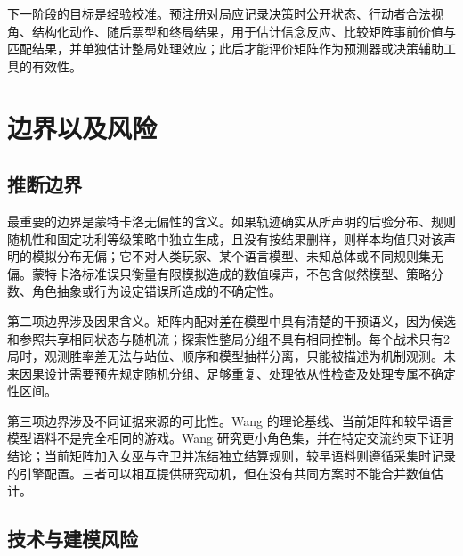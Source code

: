\documentclass[UTF8,11pt,a4paper,fontset=windows]{ctexart}
\begin{document}
下一阶段的目标是经验校准。预注册对局应记录决策时公开状态、行动者合法视角、结构化动作、随后票型和终局结果，用于估计信念反应、比较矩阵事前价值与匹配结果，并单独估计整局处理效应；此后才能评价矩阵作为预测器或决策辅助工具的有效性。

\section{边界以及风险}

\subsection{推断边界}

最重要的边界是蒙特卡洛无偏性的含义。如果轨迹确实从所声明的后验分布、规则随机性和固定功利等级策略中独立生成，且没有按结果删样，则样本均值只对该声明的模拟分布无偏；它不对人类玩家、某个语言模型、未知总体或不同规则集无偏。蒙特卡洛标准误只衡量有限模拟造成的数值噪声，不包含似然模型、策略分数、角色抽象或行为设定错误所造成的不确定性。

第二项边界涉及因果含义。矩阵内配对差在模型中具有清楚的干预语义，因为候选和参照共享相同状态与随机流；探索性整局分组不具有相同控制。每个战术只有2局时，观测胜率差无法与站位、顺序和模型抽样分离，只能被描述为机制观测。未来因果设计需要预先规定随机分组、足够重复、处理依从性检查及处理专属不确定性区间。

第三项边界涉及不同证据来源的可比性。Wang 的理论基线、当前矩阵和较早语言模型语料不是完全相同的游戏。Wang 研究更小角色集，并在特定交流约束下证明结论；当前矩阵加入女巫与守卫并冻结独立结算规则，较早语料则遵循采集时记录的引擎配置。三者可以相互提供研究动机，但在没有共同方案时不能合并数值估计。

\subsection{技术与建模风险}
\end{document}
